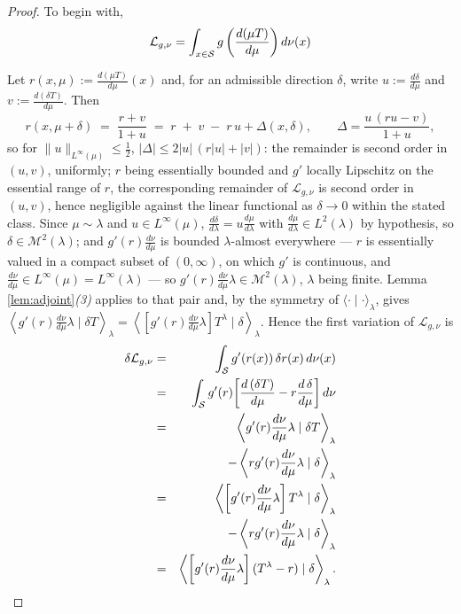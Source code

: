 \begin{proof}
 To begin with,
     \begin{eqnarray}
         \mathcal L_{g,\nu} = \int_{x\in \mathcal S} g\left(\frac{d(\mu T)}{d\mu}\right) d\nu(x)
     \end{eqnarray}

     Let $r(x,\mu) := \frac{d(\mu T)}{d\mu}(x)$ and, for an admissible direction $\delta$, write $u := \frac{d\delta}{d\mu}$ and $v := \frac{d(\delta T)}{d\mu}$. Then
\[
r(x,\mu+\delta) \;=\; \frac{r+v}{1+u} \;=\; r \;+\; v\;-\; r\,u+\Delta(x,\delta),
\qquad \Delta = \frac{u\,(ru-v)}{1+u},
\]
so for $\|u\|_{L^\infty(\mu)}\leq\frac12$, $|\Delta|\leq2|u|\,(r|u|+|v|)$: the remainder is second order in $(u,v)$, uniformly; $r$ being essentially bounded and $g'$ locally Lipschitz on the essential range of $r$, the corresponding remainder of $\mathcal L_{g,\nu}$ is second order in $(u,v)$, hence negligible against the linear functional as $\delta\rightarrow0$ within the stated class. Since $\mu\sim\lambda$ and $u\in L^\infty(\mu)$, $\frac{d\delta}{d\lambda}=u\frac{d\mu}{d\lambda}$ with $\frac{d\mu}{d\lambda}\in L^2(\lambda)$ by hypothesis, so $\delta\in\mathcal M^2(\lambda)$; and $g'(r)\frac{d\nu}{d\mu}$ is bounded $\lambda$-almost everywhere --- $r$ is essentially valued in a compact subset of $(0,\infty)$, on which $g'$ is continuous, and $\frac{d\nu}{d\mu}\in L^\infty(\mu)=L^\infty(\lambda)$ --- so $g'(r)\frac{d\nu}{d\mu}\lambda\in\mathcal M^2(\lambda)$, $\lambda$ being finite. Lemma \ref{lem:adjoint}\emph{(3)} applies to that pair and, by the symmetry of $\langle\cdot\mid\cdot\rangle_\lambda$, gives $\left\langle g'(r)\frac{d\nu}{d\mu}\lambda \mid \delta T\right\rangle_\lambda = \left\langle \left[g'(r)\frac{d\nu}{d\mu}\lambda\right]T^\lambda \mid \delta\right\rangle_\lambda$. Hence the first variation of $\mathcal L_{g,\nu}$ is
\begin{eqnarray}
\delta \mathcal L_{g,\nu}
&=& \int_{\mathcal S} g'(r(x))\,\delta r(x)\, d\nu(x)\nonumber\\
&=& \int_{\mathcal S} g'(r)\!\left[\frac{d\,(\delta T)}{d\mu}- r\frac{d\,\delta}{d\mu}\right] d\nu\nonumber\\
&=&\left\langle g'(r)\frac{d\nu}{d\mu}\lambda \mid \delta T\right\rangle_\lambda \nonumber\\
&&\quad \quad - \left\langle rg'(r)\frac{d\nu}{d\mu}\lambda \mid \delta\right\rangle_\lambda\nonumber\\
&=& \left\langle \left[g'(r)\frac{d\nu}{d\mu}\lambda\right]T^\lambda \mid \delta\right\rangle_\lambda \nonumber\\
&&\quad \quad - \left\langle r g'(r)\frac{d\nu}{d\mu}\lambda \mid \delta\right\rangle_\lambda\nonumber\\
&=&\left\langle \left[g'(r)\frac{d\nu}{d\mu}\lambda\right](T^\lambda-r) \mid \delta\right\rangle_\lambda.
\end{eqnarray}


\end{proof}
